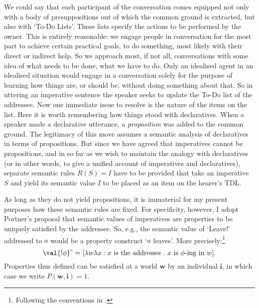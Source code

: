 
We could say that each participant of the conversation comes equipped not only with a body of presuppositions out of which the common ground is extracted, but also with `To-Do Lists'. These lists specify the actions to be performed by the owner. This is entirely reasonable: we engage people in conversation for the most part to achieve certain practical goals, to do something, most likely with their direct or indirect help. So we approach most, if not all, conversations with some idea of what needs to be done, what we have to do. Only an idealised agent in an idealised situation would engage in a conversation solely for the purpose of learning how things are, or should be, without doing something about that. So in uttering an imperative sentence the speaker seeks to update the To-Do list of the addressee. Now one immediate issue to resolve is the nature of the items on the list. Here it is worth remembering how things stood with declaratives. When a speaker made a declarative utterance, a \emph{proposition} was added to the common ground. The legitimacy of this move assumes a semantic analysis of declaratives in terms of propositions. But since we have agreed that imperatives cannot be propositions, and in so far as we wish to maintain the analogy with declaratives (or in other words, to give a unified account of imperatives and declaratives), separate semantic rules $R(S)=I$ have to be provided that take an imperative $S$ and yield its semantic value $I$ to be placed as an item on the hearer's TDL.

As long as they do not yield propositions, it is immaterial for my present purposes how these semantic rules are fixed. For specificity, however, I adopt Portner's proposal that semantic values of imperatives are properties to be uniquely satisfied by the addressee. So, e.g., the semantic value of `Leave!' addressed to $a$ would be a property construct `$a$ leaves'. More precisely:\footnote{Following the conventions in \cite{HeiKra98}.}
\begin{equation}
  \label{eq:2}
\val{!\phi}^c = [\lambda w \lambda x : \text{$x$ is the addressee} \mathrel{.} \text{$x$ is $\phi$-ing in $w$}].
\end{equation}
Properties thus defined can be satisfied at a world $\mathbf{w}$ by an individual $\mathbf{i}$, in which case we write $P(\mathbf{w,i})=1$.

